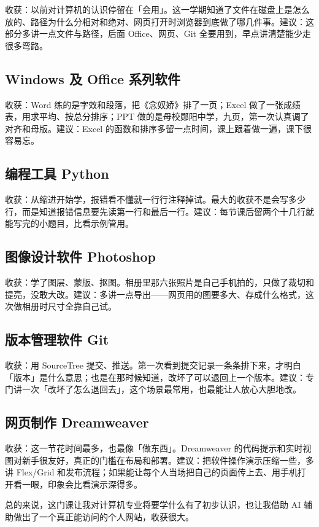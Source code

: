 \documentclass[12pt,a4paper,fontset=fandol]{ctexart}
\begin{document}
收获：以前对计算机的认识停留在「会用」。这一学期知道了文件在磁盘上是怎么放的、路径为什么分相对和绝对、网页打开时浏览器到底做了哪几件事。建议：这部分多讲一点文件与路径，后面 Office、网页、Git 全要用到，早点讲清楚能少走很多弯路。

\subsection{Windows 及 Office 系列软件}

收获：Word 练的是字效和段落，把《念奴娇》排了一页；Excel 做了一张成绩表，用求平均、按总分排序；PPT 做的是母校郧阳中学，九页，第一次认真调了对齐和母版。建议：Excel 的函数和排序多留一点时间，课上跟着做一遍，课下很容易忘。

\subsection{编程工具 Python}

收获：从缩进开始学，报错看不懂就一行行注释掉试。最大的收获不是会写多少行，而是知道报错信息要先读第一行和最后一行。建议：每节课后留两个十几行就能写完的小题目，比看示例管用。

\subsection{图像设计软件 Photoshop}

收获：学了图层、蒙版、抠图。相册里那六张照片是自己手机拍的，只做了裁切和提亮，没敢大改。建议：多讲一点导出——网页用的图要多大、存成什么格式，这次做相册时尺寸全靠自己试。

\subsection{版本管理软件 Git}

收获：用 SourceTree 提交、推送。第一次看到提交记录一条条排下来，才明白「版本」是什么意思；也是在那时候知道，改坏了可以退回上一个版本。建议：专门讲一次「改坏了怎么退回去」，这个场景最常用，也最能让人放心大胆地改。

\subsection{网页制作 Dreamweaver}

收获：这一节花时间最多，也最像「做东西」。Dreamweaver 的代码提示和实时视图对新手很友好，真正的门槛在布局和部署。建议：把软件操作演示压缩一些，多讲 Flex/Grid 和发布流程；如果能让每个人当场把自己的页面传上去、用手机打开看一眼，印象会比看演示深得多。

总的来说，这门课让我对计算机专业将要学什么有了初步认识，也让我借助 AI 辅助做出了一个真正能访问的个人网站，收获很大。
\end{document}
